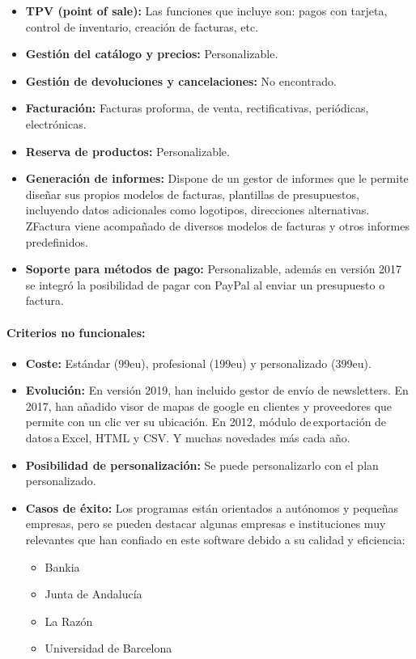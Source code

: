\documentclass{article}
\begin{document}
\begin{itemize}

	\item \textbf{TPV (point of sale):} Las funciones que incluye son: pagos con tarjeta, control de inventario, creación de facturas, etc. 
	\item \textbf{Gestión del catálogo y precios:} Personalizable.
	\item \textbf{Gestión de devoluciones y cancelaciones:} No encontrado.
	\item \textbf{Facturación:} Facturas proforma, de venta, rectificativas, periódicas, electrónicas.  
	\item \textbf{Reserva de productos:} Personalizable.
	\item \textbf{Generación de informes:} Dispone de un gestor de informes que le permite diseñar sus propios modelos de facturas, plantillas de presupuestos, incluyendo datos adicionales como logotipos, direcciones alternativas. ZFactura viene acompañado de diversos modelos de facturas y otros informes predefinidos.
	\item \textbf{Soporte para métodos de pago:} Personalizable, además en versión 2017 se integró la posibilidad de pagar con PayPal al enviar un presupuesto o factura.  

\end{itemize}

\paragraph{Criterios no funcionales:}

\begin{itemize}

	\item \textbf{Coste:} Estándar (99eu), profesional (199eu) y personalizado (399eu). 
	\item \textbf{Evolución:} En versión 2019, han incluido gestor de envío de newsletters.  
En 2017, han añadido visor de mapas de google en clientes y proveedores que permite con un clic ver su ubicación. En 2012, módulo de exportación de datos a Excel, HTML y CSV. Y muchas novedades más cada año.  
	\item \textbf{Posibilidad de personalización:} Se puede personalizarlo con el plan personalizado.  
	\item \textbf{Casos de éxito:} Los programas están orientados a autónomos y pequeñas empresas, pero se pueden destacar algunas empresas e instituciones muy relevantes que han confiado en este software debido a su calidad y eficiencia: 
	\begin{itemize}
		\item Bankia 
		\item Junta de Andalucía
		\item La Razón
		\item Universidad de Barcelona 
	\end{itemize}

\end{itemize}
\end{document}
